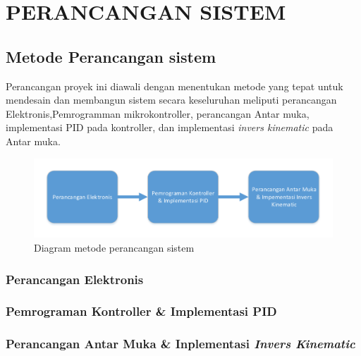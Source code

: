 
\chapter{PERANCANGAN SISTEM}

\section{Metode Perancangan sistem}
	Perancangan proyek ini diawali dengan menentukan metode yang tepat untuk mendesain dan membangun sistem secara keseluruhan meliputi perancangan Elektronis,Pemrogramman mikrokontroller, perancangan Antar muka, implementasi PID pada kontroller, dan implementasi \textit{invers kinematic} pada Antar muka.
	
	\begin{figure}[H]
		\centering
		\includegraphics[width=\linewidth]{Visio/diagram_blok.pdf}
		\caption{Diagram metode perancangan sistem}
	\end{figure}
	
	\subsection{Perancangan Elektronis}
	
	\subsection{Pemrograman Kontroller \& Implementasi PID}
	
	\subsection{Perancangan Antar Muka \& Inplementasi \textit{Invers Kinematic}}
	